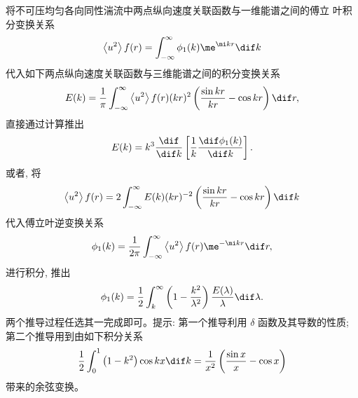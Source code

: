 \documentclass[12pt,a4]{ctexart}
\begin{document}
将不可压均匀各向同性湍流中两点纵向速度关联函数与一维能谱之间的傅立 叶积分变换关系
\begin{equation}
   \left\langle u^{2}\right\rangle f(r)=\int_{-\infty}^{\infty} \phi_{1}(k) \me^{\mi k r}\dif k
\end{equation}
代入如下两点纵向速度关联函数与三维能谱之间的积分变换关系
\begin{equation}
   E(k)=\frac{1}{\pi} \int_{-\infty}^{\infty}\left\langle u^{2}\right\rangle f(r)(k r)^{2}\left(\frac{\sin k r}{k r}-\cos k r\right) \dif r,
\end{equation}
直接通过计算推出
\begin{equation}
   E(k)=k^{3} \frac{\dif}{\dif k}\left[\frac{1}{k} \frac{\dif \phi_{1}(k)}{\dif k}\right].
\end{equation}
或者, 将
\begin{equation}
   \left\langle u^{2}\right\rangle f(r)=2 \int_{-\infty}^{\infty} E(k)(k r)^{-2}\left(\frac{\sin k r}{k r}-\cos k r\right)\dif k
   \label{eq:41}
\end{equation}
代入傅立叶逆变换关系
\begin{equation}
   \phi_{1}(k)=\frac{1}{2 \pi} \int_{-\infty}^{\infty}\left\langle u^{2}\right\rangle f(r) \me^{-\mi k r} \dif r,
   \label{eq:42}
\end{equation}
进行积分, 推出
\begin{equation}
   \phi_{1}(k)=\frac{1}{2} \int_{k}^{\infty}\left(1-\frac{k^{2}}{\lambda^{2}}\right) \frac{E(\lambda)}{\lambda} \dif \lambda.
\end{equation}
两个推导过程任选其一完成即可。提示: 第一个推导利用 $\delta$ 函数及其导数的性质; 第二个推导用到由如下积分关系
\begin{equation}
   \frac{1}{2} \int_{0}^{1}\left(1-k^{2}\right) \cos k x \dif k=\frac{1}{x^{2}}\left(\frac{\sin x}{x}-\cos x\right)
   \label{eq:43}
\end{equation}
带来的余弦变换。
\end{document}
